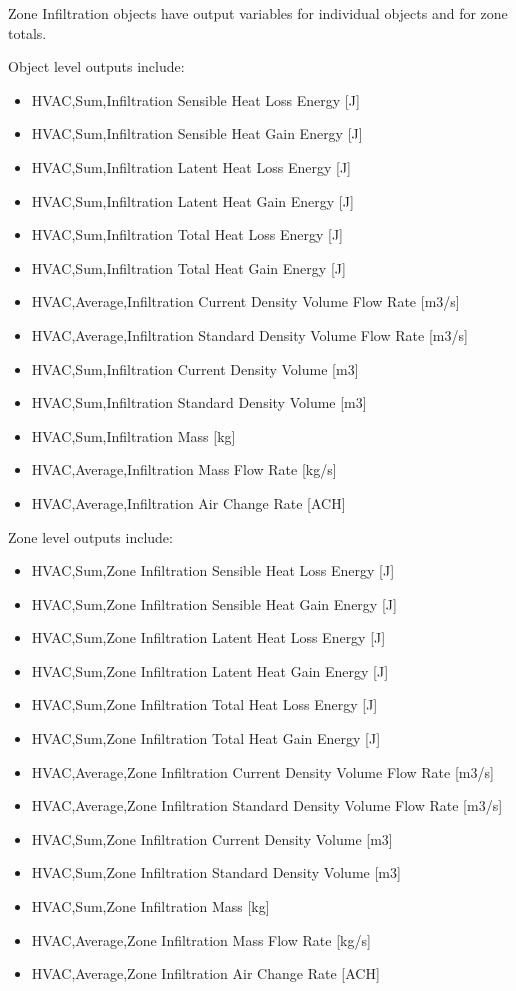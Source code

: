 Zone Infiltration objects have output variables for individual objects and for zone totals.

Object level outputs include:

\begin{itemize}
\item
  HVAC,Sum,Infiltration Sensible Heat Loss Energy {[}J{]}
\item
  HVAC,Sum,Infiltration Sensible Heat Gain Energy {[}J{]}
\item
  HVAC,Sum,Infiltration Latent Heat Loss Energy {[}J{]}
\item
  HVAC,Sum,Infiltration Latent Heat Gain Energy {[}J{]}
\item
  HVAC,Sum,Infiltration Total Heat Loss Energy {[}J{]}
\item
  HVAC,Sum,Infiltration Total Heat Gain Energy {[}J{]}
\item
  HVAC,Average,Infiltration Current Density Volume Flow Rate {[}m3/s{]}
\item
  HVAC,Average,Infiltration Standard Density Volume Flow Rate {[}m3/s{]}
\item
  HVAC,Sum,Infiltration Current Density Volume {[}m3{]}
\item
  HVAC,Sum,Infiltration Standard Density Volume {[}m3{]}
\item
  HVAC,Sum,Infiltration Mass {[}kg{]}
\item
  HVAC,Average,Infiltration Mass Flow Rate {[}kg/s{]}
\item
  HVAC,Average,Infiltration Air Change Rate {[}ACH{]}
\end{itemize}

Zone level outputs include:

\begin{itemize}
\item
  HVAC,Sum,Zone Infiltration Sensible Heat Loss Energy {[}J{]}
\item
  HVAC,Sum,Zone Infiltration Sensible Heat Gain Energy {[}J{]}
\item
  HVAC,Sum,Zone Infiltration Latent Heat Loss Energy {[}J{]}
\item
  HVAC,Sum,Zone Infiltration Latent Heat Gain Energy {[}J{]}
\item
  HVAC,Sum,Zone Infiltration Total Heat Loss Energy {[}J{]}
\item
  HVAC,Sum,Zone Infiltration Total Heat Gain Energy {[}J{]}
\item
  HVAC,Average,Zone Infiltration Current Density Volume Flow Rate {[}m3/s{]}
\item
  HVAC,Average,Zone Infiltration Standard Density Volume Flow Rate {[}m3/s{]}
\item
  HVAC,Sum,Zone Infiltration Current Density Volume {[}m3{]}
\item
  HVAC,Sum,Zone Infiltration Standard Density Volume {[}m3{]}
\item
  HVAC,Sum,Zone Infiltration Mass {[}kg{]}
\item
  HVAC,Average,Zone Infiltration Mass Flow Rate {[}kg/s{]}
\item
  HVAC,Average,Zone Infiltration Air Change Rate {[}ACH{]}
\end{itemize}

